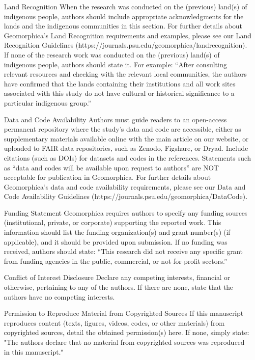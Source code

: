 \documentclass[titlepage]{geomorphica}
\begin{document}
\begin{closing}{Land Recognition}
	When the research was conducted on the (previous) land(s) of indigenous people, authors should include appropriate acknowledgments for the lands and the indigenous communities in this section. For further details about Geomorphica’s Land Recognition requirements and examples, please see our Land Recognition Guidelines (https://journals.psu.edu/geomorphica/landrecognition).
If none of the research work was conducted on the (previous) land(s) of indigenous people, authors should state it. For example:
“After consulting relevant resources and checking with the relevant local communities, the authors have confirmed that the lands containing their institutions and all work sites associated with this study do not have cultural or historical significance to a particular indigenous group.”
\end{closing}
\begin{closing}{Data and Code Availability}
	Authors must guide readers to an open-access permanent repository where the study's data and code are accessible, either as supplementary materials available online with the main article on our website, or uploaded to FAIR data repositories, such as Zenodo, Figshare, or Dryad. Include citations (such as DOIs) for datasets and codes in the references. Statements such as “data and codes will be available upon request to authors” are NOT acceptable for publication in Geomorphica.
For further details about Geomorphica’s data and code availability requirements, please see our Data and Code Availability Guidelines (https://journals.psu.edu/geomorphica/DataCode).
\end{closing}
\begin{closing}{Funding Statement}
	Geomorphica requires authors to specify any funding sources (institutional, private, or corporate) supporting the reported work. This information should list the funding organization(s) and grant number(s) (if applicable), and it should be provided upon submission. If no funding was received, authors should state: “This research did not receive any specific grant from funding agencies in the public, commercial, or not-for-profit sectors.”
\end{closing}
\begin{closing}{Conflict of Interest Disclosure}
	Declare any competing interests, financial or otherwise, pertaining to any of the authors. If there are none, state that the authors have no competing interests.
\end{closing}
\begin{closing}{Permission to Reproduce Material from Copyrighted Sources}
	If this manuscript reproduces content (texts, figures, videos, codes, or other materials) from copyrighted sources, detail the obtained permission(s) here. If none, simply state: "The authors declare that no material from copyrighted sources was reproduced in this manuscript."
\end{closing}
\end{document}
